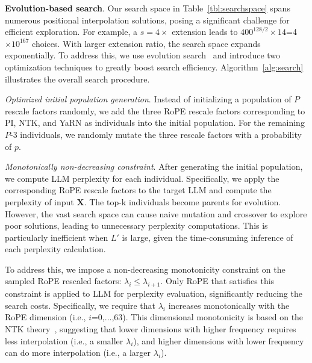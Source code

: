 \textbf{Evolution-based search}. Our search space in Table~\ref{tbl:searchspace} spans numerous positional interpolation solutions, posing a significant challenge for efficient exploration.  For example, a $s=4\times$ extension leads to  $400^{128/2}\times14$=4$\times10^{167}$ choices. With larger extension ratio,  the search space  expands exponentially. To address this, we use evolution search~\cite{guo2020single}  and introduce  two optimization techniques to greatly boost search efficiency. Algorithm~\ref{alg:search} illustrates the overall search procedure. 

\textit{Optimized initial population generation}. Instead of initializing a population  of $P$ rescale factors randomly, we add the three RoPE rescale factors corresponding to PI, NTK, and YaRN as individuals into the initial population. For the remaining $P$-3 individuals, we randomly mutate the three rescale factors with a probability of $p$. 

\textit{Monotonically non-decreasing constraint}. After generating the initial population, we compute LLM perplexity for each individual. Specifically, we apply the corresponding RoPE rescale factors to the target LLM and compute the perplexity of  input $\mathbf{X}$. The top-k individuals become parents for evolution. However, the vast search space can cause naive mutation and crossover to explore poor solutions, leading to unnecessary perplexity computations. This is particularly inefficient when $L'$ is large, given the time-consuming inference  of each perplexity calculation.

To address this, we impose a non-decreasing monotonicity constraint on the sampled RoPE rescaled factors: $\lambda_i\le \lambda_{i+1}$.
Only RoPE that satisfies this constraint is applied to LLM for perplexity evaluation, significantly reducing the search costs. Specifically,   we require that $\lambda_i$ increases monotonically with the RoPE dimension (i.e., $i$=0,...,63). This dimensional monotonicity is based on the NTK theory~\cite{jacot2018neural,tancik2020fourier,ntk}, suggesting that lower dimensions with higher frequency requires less interpolation (i.e., a smaller $\lambda_i$), and higher dimensions with lower frequency can do more interpolation (i.e.,  a larger $\lambda_i$).

